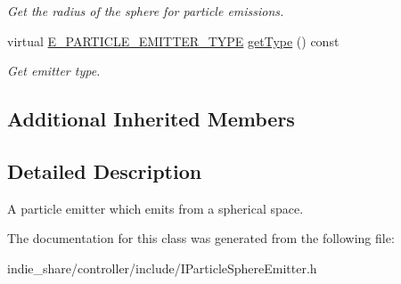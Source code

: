 \begin{DoxyCompactItemize}
\begin{DoxyCompactList}\small\item\em Get the radius of the sphere for particle emissions. \end{DoxyCompactList}\item 
\mbox{\label{classirr_1_1scene_1_1IParticleSphereEmitter_aed807c85d4a31076ffff8f2bc3524124}} 
virtual \hyperlink{namespaceirr_1_1scene_a3e251a881c886884a78adea2e546272b}{E\+\_\+\+P\+A\+R\+T\+I\+C\+L\+E\+\_\+\+E\+M\+I\+T\+T\+E\+R\+\_\+\+T\+Y\+PE} \hyperlink{classirr_1_1scene_1_1IParticleSphereEmitter_aed807c85d4a31076ffff8f2bc3524124}{get\+Type} () const
\begin{DoxyCompactList}\small\item\em Get emitter type. \end{DoxyCompactList}\end{DoxyCompactItemize}
\subsection*{Additional Inherited Members}


\subsection{Detailed Description}
A particle emitter which emits from a spherical space. 

The documentation for this class was generated from the following file\+:\begin{DoxyCompactItemize}
\item 
indie\+\_\+share/controller/include/I\+Particle\+Sphere\+Emitter.\+h\end{DoxyCompactItemize}
